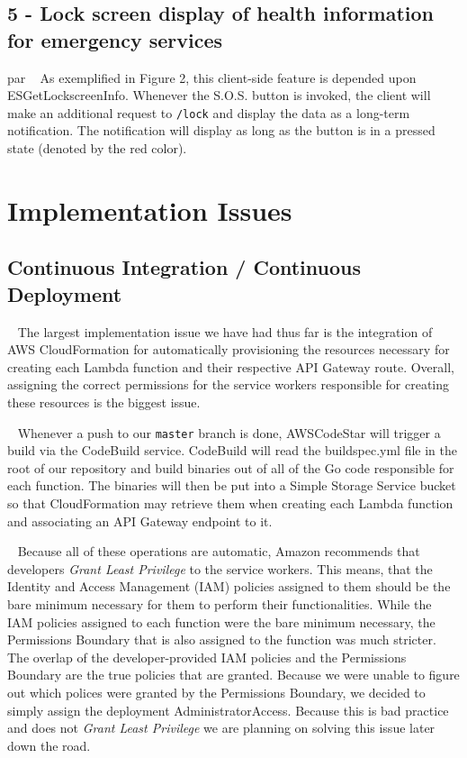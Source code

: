\documentclass[10pt, a4paper]{article}
\begin{document}
\subsection{5 - Lock screen display of health information for emergency services}
par ~ As exemplified in Figure 2, this client-side feature is depended upon ESGetLockscreenInfo. Whenever the S.O.S. button is invoked, the client will make an additional request to \texttt{/lock} and display the data as a long-term notification. The notification will display as long as the button is in a pressed state (denoted by the red color).

\section{Implementation Issues}
\subsection{Continuous Integration / Continuous Deployment}
\label{sec:cicd}
\par ~ The largest implementation issue we have had thus far is the integration of AWS CloudFormation for automatically provisioning the resources necessary for creating each Lambda function and their respective API Gateway route. Overall, assigning the correct permissions for the service workers responsible for creating these resources is the biggest issue.

\par ~ Whenever a push to our \texttt{master} branch is done, AWSCodeStar will trigger a build via the CodeBuild service. CodeBuild will read the buildspec.yml file in the root of our repository and build binaries out of all of the Go code responsible for each function. The binaries will then be put into a Simple Storage Service bucket so that CloudFormation may retrieve them when creating each Lambda function and associating an API Gateway endpoint to it. 
\par ~ Because all of these operations are automatic, Amazon recommends that developers \emph{Grant Least Privilege} to the service workers. This means, that the Identity and Access Management (IAM) policies assigned to them should be the bare minimum necessary for them to perform their functionalities. While the IAM policies assigned to each function were the bare minimum necessary, the Permissions Boundary that is also assigned to the function was much stricter. The overlap of the developer-provided IAM policies and the Permissions Boundary are the true policies that are granted. Because we were unable to figure out which polices were granted by the Permissions Boundary, we decided to simply assign the deployment AdministratorAccess. Because this is bad practice and does not \emph{Grant Least Privilege} we are planning on solving this issue later down the road.
\end{document}
